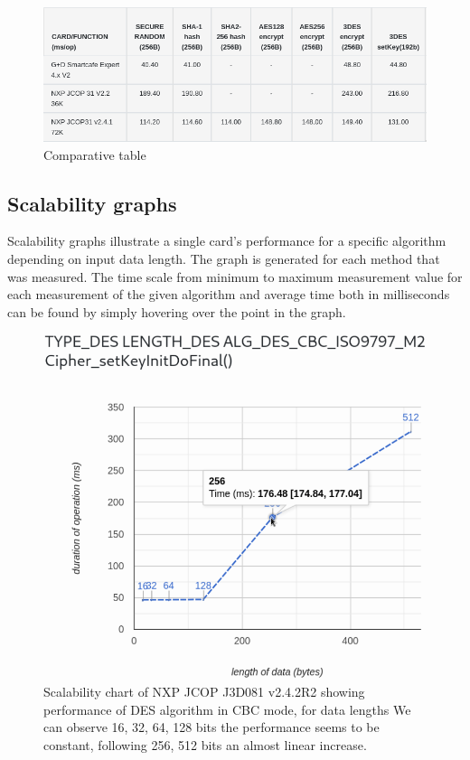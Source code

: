 \begin{figure}[H]
    \centering
    \includegraphics[width=\textwidth]{img/comparative-table.png}
    \caption{Comparative table}
    \label{fig:comparative-table}
\end{figure}

\subsection{Scalability graphs}
Scalability graphs illustrate a single card's performance for a specific algorithm depending on input data length. The graph is generated for each method that was measured. The time scale from minimum to maximum measurement value for each measurement of the given algorithm and average time both in milliseconds can be found by simply hovering over the point in the graph.

\begin{figure}[H]
    \centering  
    \includegraphics[width=\textwidth-3.5cm]{img/NXP_JCOP_J3D081_v2.4.2R2 scalability graph.png}
    \caption{
    Scalability chart of NXP JCOP J3D081 v2.4.2R2 showing performance of DES algorithm in CBC mode, for data lengths We can observe 16, 32, 64, 128 bits the performance seems to be constant, following 256, 512 bits an almost linear increase.
    }
    \label{fig:scalability-chart}
\end{figure}




